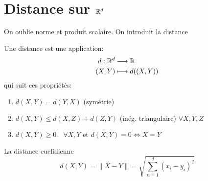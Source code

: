 \section{Distance sur $\mathbb{R}^d$}
On oublie norme et produit scalaire. On introduit la distance
\begin{definition}\label{def:distance} Une distance est une application:
    \begin{align*}
        d: \mathbb{R}^d &\longrightarrow \mathbb{R} \\
        (X, Y) &\longmapsto d((X, Y)) 
    \end{align*}
    qui suit ces propriétés:
    \begin{enumerate}
        \item $d(X, Y) = d(Y, X)$ (symétrie)
        \item $d(X, Y) \le d(X, Z) + d(Z, Y)$ (inég. triangulaire) $\forall X, Y, Z$ 
        \item $d(X, Y) \ge 0 \quad \forall X, Y$ et $d(X, Y) = 0 \iff X = Y$ 
    \end{enumerate}
\end{definition}
\begin{definition} La distance euclidienne
    \[
        d(X, Y) = \|X - Y\| = \sqrt{\sum_{n=1}^{d} (x_i - y_i)^2} 
    \] 
\end{definition}
